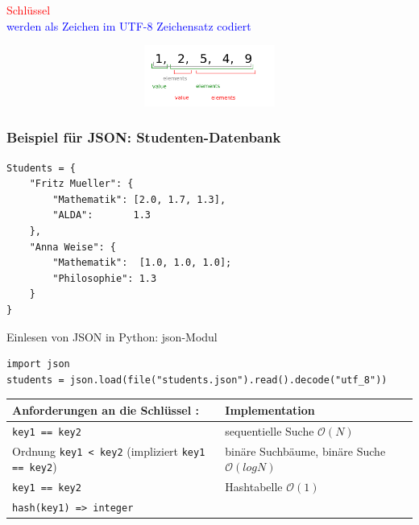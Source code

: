 \documentclass[11pt, fleqn]{scrreprt}
\newcommand{\bigO}[0]{\mathcal{O}}
\begin{document}
\textcolor{red}{Schlüssel} \\
\textcolor{blue}{werden als Zeichen im UTF-8 Zeichensatz codiert}

\includegraphics[width=16cm,height=2cm,keepaspectratio]{./Pictures/komischesArray.png}

\subsubsection*{Beispiel für JSON: Studenten-Datenbank}
\begin{verbatim}
Students = {
    "Fritz Mueller": {
        "Mathematik": [2.0, 1.7, 1.3],
        "ALDA":       1.3
    },
    "Anna Weise": {
        "Mathematik":  [1.0, 1.0, 1.0];
        "Philosophie": 1.3
    }
}
\end{verbatim}
Einlesen von JSON in Python: json-Modul

\begin{verbatim}
import json
students = json.load(file("students.json").read().decode("utf_8"))
\end{verbatim}

\vspace*{1cm}

\begin{tabular}{L{8.5cm} | L{7cm}}
    \textbf{Anforderungen an die Schlüssel :} & Implementation \\ \hline
    \verb|key1 == key2| & sequentielle Suche $\bigO{}(N)$ \\ \hline
    Ordnung \verb|key1 < key2| (impliziert \verb|key1 == key2|) & binäre Suchbäume, binäre Suche $\bigO{}(log N)$ \\ \hline
    \verb|key1 == key2| & Hashtabelle \hspace*{2cm} $\bigO{}(1)$ \\
    \verb|hash(key1) => integer| & \\
\end{tabular}

\vspace*{1cm}
\end{document}

